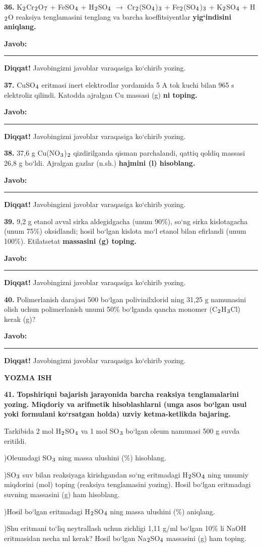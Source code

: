 \documentclass[11pt,a4paper]{article}
\renewcommand{\textsubscript}[1]{\ensuremath{_{\text{\fontsize{8}{8}\selectfont #1}}}}
\newcommand{\javob}{\par\smallskip\noindent\textbf{Javob:} \rule[-2pt]{7.5cm}{0.4pt}\par\smallskip\noindent\textbf{Diqqat!} Javobingizni javoblar varaqasiga ko`chirib yozing.\par\medskip}
\begin{document}
\par\bigskip
\noindent\textbf{36.} K\textsubscript{2}Cr\textsubscript{2}O\textsubscript{7} + FeSO\textsubscript{4} + H\textsubscript{2}SO\textsubscript{4} $\to$ Cr\textsubscript{2}(SO\textsubscript{4})\textsubscript{3} + Fe\textsubscript{2}(SO\textsubscript{4})\textsubscript{3} + K\textsubscript{2}SO\textsubscript{4} + H\textsubscript{2}O reaksiya tenglamasini tenglang va barcha koeffitsiyentlar \textbf{yig`indisini aniqlang.}
\javob
\noindent\textbf{37.} CuSO\textsubscript{4} eritmasi inert elektrodlar yordamida 5 A tok kuchi bilan 965 s elektroliz qilindi. Katodda ajralgan Cu massasi (g) \textbf{ni toping.}
\javob
\noindent\textbf{38.} 37,6 g Cu(NO\textsubscript{3})\textsubscript{2} qizdirilganda qisman parchalandi, qattiq qoldiq massasi 26,8 g bo`ldi. Ajralgan gazlar (n.sh.) \textbf{hajmini (l) hisoblang.}
\javob
\noindent\textbf{39.} 9,2 g etanol avval sirka aldegidgacha (unum 90\%), so`ng sirka kislotagacha (unum 75\%) oksidlandi; hosil bo`lgan kislota mo`l etanol bilan efirlandi (unum 100\%). Etilatsetat \textbf{massasini (g) toping.}
\javob
\noindent\textbf{40.} Polimerlanish darajasi 500 bo`lgan polivinilxlorid ning 31,25 g namunasini olish uchun polimerlanish unumi 50\% bo`lganda qancha monomer (C\textsubscript{2}H\textsubscript{3}Cl) kerak (g)?
\javob
\par\bigskip\begin{center}\textbf{\fontsize{13}{15}\selectfont YOZMA ISH}\end{center}
\noindent\textbf{41.} \textbf{Topshiriqni bajarish jarayonida barcha reaksiya tenglamalarini yozing. Miqdoriy va arifmetik hisoblashlarni (unga asos bo`lgan usul yoki formulani ko`rsatgan holda) uzviy ketma-ketlikda bajaring.}\par\smallskip
Tarkibida 2 mol H\textsubscript{2}SO\textsubscript{4} va 1 mol SO\textsubscript{3} bo`lgan oleum namunasi 500 g suvda eritildi.\par
{})Oleumdagi SO\textsubscript{3} ning massa ulushini (\%) hisoblang.\par
{})SO\textsubscript{3} suv bilan reaksiyaga kirishgandan so`ng eritmadagi H\textsubscript{2}SO\textsubscript{4} ning umumiy miqdorini (mol) toping (reaksiya tenglamasini yozing). Hosil bo`lgan eritmadagi suvning massasini (g) ham hisoblang.\par
{})Hosil bo`lgan eritmadagi H\textsubscript{2}SO\textsubscript{4} ning massa ulushini (\%) aniqlang.\par
{})Shu eritmani to`liq neytrallash uchun zichligi 1,11 g/ml bo`lgan 10\% li NaOH eritmasidan necha ml kerak? Hosil bo`lgan Na\textsubscript{2}SO\textsubscript{4} massasini (g) ham toping.\par
\end{document}
